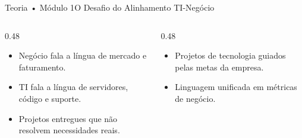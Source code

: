 \begin{senaiframe}{Teoria • Módulo 1}{O Desafio do Alinhamento TI-Negócio}
  \begin{columns}[t]
    \begin{column}{0.48\textwidth}
      \begin{tcolorbox}[senairedcard, title={O Abismo Tradicional}]
        \begin{itemize}
          \item Negócio fala a língua de mercado e faturamento.
          \item TI fala a língua de servidores, código e suporte.
          \item Projetos entregues que não resolvem necessidades reais.
        \end{itemize}
      \end{tcolorbox}
    \end{column}
    \begin{column}{0.48\textwidth}
      \begin{tcolorbox}[senaigreencard, title={A TI Alinhada}]
        \begin{itemize}
          \item Projetos de tecnologia guiados pelas metas da empresa.
          \item Linguagem unificada em métricas de negócio.
        \end{itemize}
      \end{tcolorbox}
    \end{column}
  \end{columns}
\end{senaiframe}

